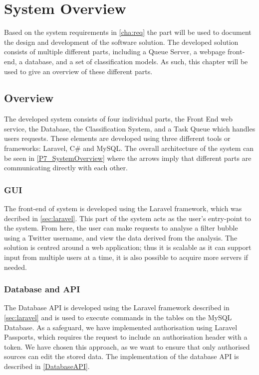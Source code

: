 \chapter{System Overview}\label{ch:sysview}
Based on the system requirements in \autoref{cha:req} the part will be used to
document the design and development of the software solution. The developed
solution consists of multiple different parts, including a Queue Server, a
webpage front-end, a database, and a set of classification models. As such, this
chapter will be used to give an overview of these different parts.

\section{Overview}
The developed system consists of four individual parts, the Front End web
service, the Database, the Classification System, and a Task Queue which handles
users requests. These elements are developed using three different tools or
frameworks: Laravel, C\# and MySQL. The overall architecture of the system can
be seen in \autoref{P7_SystemOverview} where the arrows imply that different
parts are communicating directly with each other.
 

\subsection{GUI} %
The front-end of system is developed using the Laravel framework, which was
decribed in \autoref{sec:laravel}. This part of the system acts as the user's
entry-point to the system. From here, the user can make requests to analyse a
filter bubble using a Twitter username, and view the data derived from the
analysis. The solution is centred around a web application; thus it is scalable
as it can support input from multiple users at a time, it is also possible to
acquire more servers if needed.

\subsection{Database and API}
The Database \ac{API} is developed using the Laravel framework described in
\autoref{sec:laravel} and is used to execute commands in the tables on the MySQL
Database. As a safeguard, we have implemented authorisation using Laravel
Passports, which requires the request to include an authorisation header with a
 token. We have chosen this approach, as we want to ensure that
only authorised sources can edit the stored data. The implementation of the
database \ac{API} is described in \autoref{DatabaseAPI}.

